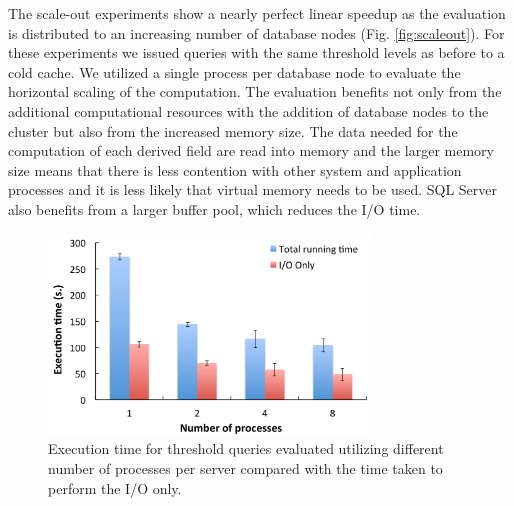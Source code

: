 \documentclass{sig-alternate}
\begin{document}
The scale-out experiments show a nearly perfect linear speedup as the evaluation is distributed to an increasing number of database nodes 
(Fig. \ref{fig:scaleout}). For these experiments we issued queries with the same threshold levels as before to a cold cache. We utilized a single process per
database node to evaluate the horizontal scaling of the computation. The evaluation benefits not only from the additional computational resources with
the addition of database nodes to the cluster but also from the increased memory size. The data needed for the computation of each derived field are
read into memory and the larger memory size means that there is less contention with other system and application processes and it is less likely that
virtual memory needs to be used. SQL Server also benefits from a larger buffer pool, which reduces the I/O time.

\begin{figure}
\centering
\includegraphics[width=3.35in]{Figures/io_comparison.pdf}
\caption{Execution time for threshold queries evaluated utilizing different number of
processes per server compared with the time taken to perform the I/O only.}
\label{fig:io_comparison}
\end{figure}
\end{document}
